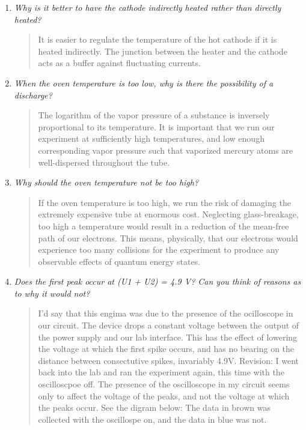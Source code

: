 \documentclass{amsart}
\begin{document}
\begin{enumerate}
\item {\textit{Why is it better to have the cathode indirectly heated rather than directly heated?}
\begin{quote}
It is easier to regulate the temperature of the hot cathode if it is heated indirectly. The junction between the heater and the cathode acts as a buffer against fluctuating currents.
\end{quote}}

\item{\textit{When the oven temperature is too low, why is there the possibility of a discharge?}
\begin{quote}
The logarithm of the vapor pressure of a substance is inversely proportional to its temperature. It is important that we run our experiment at sufficiently high temperatures, and low enough corresponding vapor pressure such that vaporized mercury atoms are well-dispersed throughout the tube.
\end{quote}}

\item{\textit{Why should the oven temperature not be too high?}
\begin{quote}
If the oven temperature is too high, we run the risk of damaging the extremely expensive tube at enormous cost. Neglecting glass-breakage, too high a temperature would result in a reduction of the mean-free path of our electrons. This means, physically, that our electrons would experience too many collisions for the experiment to produce any observable effects of quantum energy states.
\end{quote}}

\item{\textit{Does the first peak occur at (U1 + U2) = 4.9 V? Can you think of reasons as to why it would not?}
\begin{quote}
I'd say that this engima was due to the presence of the ocilloscope in our circuit. The device drops a constant voltage between the output of the power supply and our lab interface. This has the effect of lowering the voltage at which the first spike occurs, and has no bearing on the distance between consectutive spikes, invariably 4.9V.
Revision: I went back into the lab and ran the experiment again, this time with the oscilloscpoe off. The presence of the oscilloscope in my circuit seems only to affect the voltage of the peaks, and not the voltage at which the peaks occur. See the digram below: The data in brown was collected with the oscillospe on, and the data in blue was not.


\end{quote}}
\end{enumerate}
\end{document}
